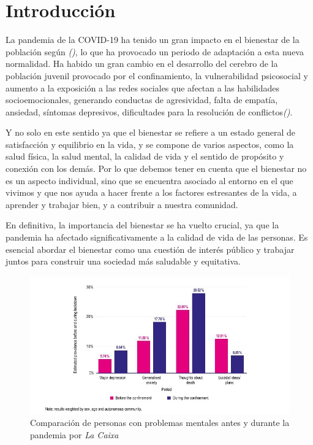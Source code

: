 \chapter{Introducción}


La pandemia de la COVID-19 ha tenido un gran impacto en el bienestar de la población según \textit{(\cite{oms2022})}, lo que ha provocado un periodo de adaptación a esta nueva normalidad. Ha habido un gran cambio en el desarrollo del cerebro de la población juvenil provocado por el confinamiento, la vulnerabilidad psicosocial y aumento a la exposición a las redes sociales que afectan a las habilidades socioemocionales, generando conductas de agresividad, falta de empatía, ansiedad, síntomas depresivos, dificultades para la resolución de conflictos\textit{(\cite{psychiatry2020})}. 

Y no solo en este sentido ya que el bienestar se refiere a un estado general de satisfacción y equilibrio en la vida, y se compone de varios aspectos, como la salud física, la salud mental, la calidad de vida y el sentido de propósito y conexión con los demás. Por lo que debemos tener en cuenta que el bienestar no es un aspecto individual, sino que se encuentra asociado al entorno en el que vivimos y que nos ayuda a hacer frente a los factores estresantes de la vida, a aprender y trabajar bien, y a contribuir a nuestra comunidad. \vspace{0.3cm}

En definitiva, la importancia del bienestar se ha vuelto crucial, ya que la pandemia ha afectado significativamente a la calidad de vida de las personas. Es esencial abordar el bienestar como una cuestión de interés público y trabajar juntos para construir una sociedad más saludable y equitativa. \\[3cm]

\begin{figure}[h]
    \centering
    \includegraphics[width=1\textwidth]{imagenes/graficaCovid.jpg}
    \caption{ Comparación de personas con problemas mentales antes y durante la pandemia por \textit{La Caixa}}
    \label{fig:enter-label}
\end{figure}


